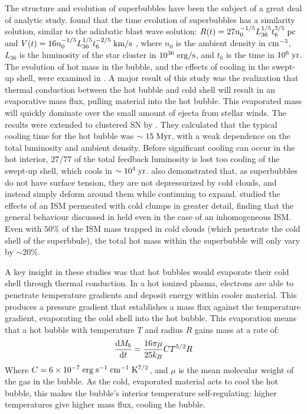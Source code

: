 The structure and evolution of superbubbles have been the subject of a great
deal of analytic study.  \citet{Castor1975} found that the time evolution of
superbubbles has a similarity solution, similar to the \citet{Sedov1959}
adiabatic blast wave solution: $R(t)=27n_0^{-1/5}L_{36}^{1/5}t_6^{3/5}\;\rm{pc}$
and $V(t)=16n_0^{-1/5}L_{36}^{1/5}t_6^{-2/5}\;\rm{km/s}$ , where $n_0$ is the
ambient density in $\rm{cm^{-3}}$, $L_{36}$ is the luminosity of the star
cluster in $10^{36}\;\rm{erg/s}$, and $t_6$ is the time in $10^6\;\rm{yr}$.  The
evolution of hot mass in the bubble, and the effects of cooling in the swept-up
shell, were examined in \citet{Weaver1977}.  A major result of this study was
the realization that thermal conduction between the hot bubble and cold shell
will result in an evaporative mass flux, pulling material into the hot bubble.
This evaporated mass will quickly dominate over the small amount of ejecta from
stellar winds.  The \citet{Weaver1977} results were extended to clustered SN by
\citet{MacLow1988}.  They calculated that the typical cooling time for the hot
bubble was $\sim15\;\rm{Myr}$, with a weak dependence on the total luminosity
and ambient density.  Before significant cooling can occur in the hot interior,
$27/77$ of the total feedback luminosity is lost too cooling of the swept-up
shell, which cools in $\sim10^4\;\rm{yr}$.  \citet{MacLow1988} also demonstrated
that, as superbubbles do not have surface tension, they are not depressurized by
cold clouds, and instead simply deform around them while continuing to expand.
\citet{Silich1996} studied the effects of an ISM permeated with cold clumps in
greater detail, finding that the general behaviour discussed in
\citet{MacLow1988} held even in the case of an inhomogeneous ISM.  Even with
$50\%$ of the ISM mass trapped in cold clouds (which penetrate the cold shell of
the superbbule), the total hot mass within the superbubble will only vary by $\sim20\%$.

A key insight in these studies was that hot bubbles would evaporate their cold
shell through thermal conduction.  In a hot ionized plasma, electrons are able
to penetrate temperature gradients and deposit energy within cooler material.
This produces a pressure gradient that establishes a mass flux against the
temperature gradient, evaporating the cold shell into the hot bubble.  This
evaporation means that a hot bubble with temperature $T$ and radius $R$ gains
mass at a rate of:
\begin{equation}
    \frac{{\rm d }M_b}{{\rm d}t} = \frac{16\pi\mu}{25k_B} CT^{5/2}R
\end{equation}
Where $C=6\times10^{-7}\;\rm{erg\;s^{-1}\;cm^{-1}\;K^{7/2}}$, and $\mu$ is the
mean molecular weight of the gas in the bubble.  As the cold, evaporated
material acts to cool the hot bubble, this makes the bubble's interior
temperature self-regulating: higher temperatures give higher mass flux, cooling
the bubble.


